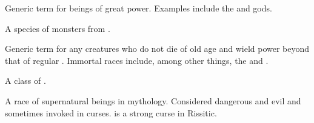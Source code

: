 \begin{gloss}
\begin{comment}
\paragraph{god}
\end{comment}
Generic term for  beings of great power. 
Examples include the  and  gods. 









\begin{comment}
\paragraph{\grimrat}
\end{comment}
\gitem{\grimrat}
A species of monsters from . 









\begin{comment}
\paragraph{immortal}
\end{comment}
Generic term for any creatures who do not die of old age and wield power beyond that of regular . 
Immortal races include, among other things, the \dragons{} and \resphain.  







\begin{comment}
\paragraph{\malach}
\end{comment}
\gitem[\malachim]{\malach}
A class of . 







\begin{comment}
\paragraph{\Maskim}
\end{comment}
\gitem[\Maskim]{\Maskim}
A race of supernatural beings in  mythology. 
Considered dangerous and evil and sometimes invoked in curses. 
 is a strong curse in Rissitic.


\end{gloss}
